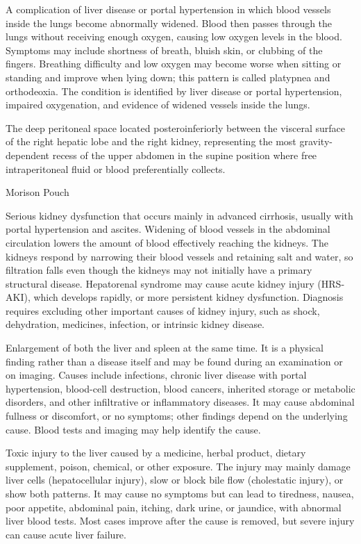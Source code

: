  A complication of liver disease or portal hypertension in which blood vessels inside the lungs become abnormally widened. Blood then passes through the lungs without receiving enough oxygen, causing low oxygen levels in the blood. Symptoms may include shortness of breath, bluish skin, or clubbing of the fingers. Breathing difficulty and low oxygen may become worse when sitting or standing and improve when lying down; this pattern is called platypnea and orthodeoxia. The condition is identified by liver disease or portal hypertension, impaired oxygenation, and evidence of widened vessels inside the lungs.

 The deep peritoneal space located posteroinferiorly between the visceral surface of the right hepatic lobe and the right kidney, representing the most gravity-dependent recess of the upper abdomen in the supine position where free intraperitoneal fluid or blood preferentially collects.

\synonyms
Morison Pouch

 Serious kidney dysfunction that occurs mainly in advanced cirrhosis, usually with portal hypertension and ascites. Widening of blood vessels in the abdominal circulation lowers the amount of blood effectively reaching the kidneys. The kidneys respond by narrowing their blood vessels and retaining salt and water, so filtration falls even though the kidneys may not initially have a primary structural disease. Hepatorenal syndrome may cause acute kidney injury (HRS-AKI), which develops rapidly, or more persistent kidney dysfunction. Diagnosis requires excluding other important causes of kidney injury, such as shock, dehydration, medicines, infection, or intrinsic kidney disease.

 Enlargement of both the liver and spleen at the same time. It is a physical finding rather than a disease itself and may be found during an examination or on imaging. Causes include infections, chronic liver disease with portal hypertension, blood-cell destruction, blood cancers, inherited storage or metabolic disorders, and other infiltrative or inflammatory diseases. It may cause abdominal fullness or discomfort, or no symptoms; other findings depend on the underlying cause. Blood tests and imaging may help identify the cause.

 Toxic injury to the liver caused by a medicine, herbal product, dietary supplement, poison, chemical, or other exposure. The injury may mainly damage liver cells (hepatocellular injury), slow or block bile flow (cholestatic injury), or show both patterns. It may cause no symptoms but can lead to tiredness, nausea, poor appetite, abdominal pain, itching, dark urine, or jaundice, with abnormal liver blood tests. Most cases improve after the cause is removed, but severe injury can cause acute liver failure.

